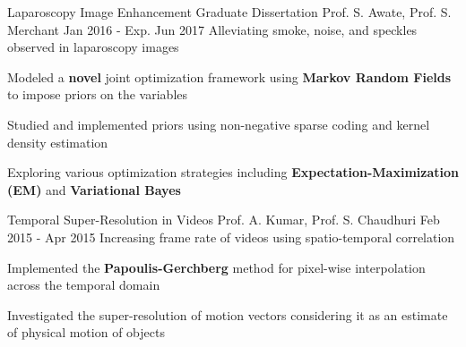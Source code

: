 \begin{cventries}
%
%
\projectentry
{Laparoscopy Image Enhancement} %
{Graduate Dissertation} %
{Prof. S. Awate, Prof. S. Merchant} %
{Jan 2016 - Exp. Jun 2017} %
{Alleviating smoke, noise, and speckles observed in laparoscopy images} %
{ %
\begin{cvitems}
\item {Modeled a \textbf{novel} joint optimization framework using \textbf{Markov Random Fields} to impose priors on the variables}
\item {Studied and implemented priors using non-negative sparse coding and kernel density estimation}
\item {Exploring various optimization strategies including \textbf{Expectation-Maximization (EM)} and \textbf{Variational Bayes}}
\end{cvitems}
}
\acadprojectentry
{Temporal Super-Resolution in Videos} %
{Prof. A. Kumar, Prof. S. Chaudhuri} %
{Feb 2015 - Apr 2015} %
{Increasing frame rate of videos using spatio-temporal correlation} %
{ %
\begin{cvitems}
\item {Implemented the \textbf{Papoulis-Gerchberg} method for pixel-wise interpolation across the temporal domain}
\item {Investigated the super-resolution of motion vectors considering it as an estimate of physical motion of objects}
\end{cvitems}
}
\end{cventries}